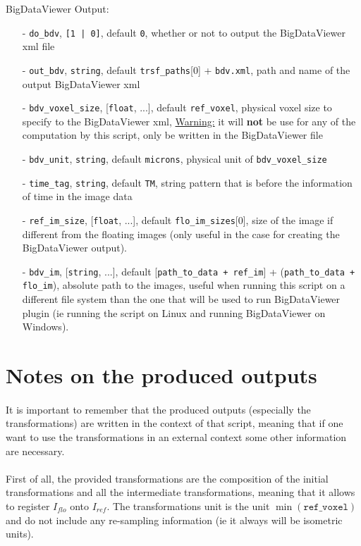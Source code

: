 \documentclass[10pt,a4paper]{book}
\begin{document}
BigDataViewer Output:
\begin{enumerate}
\item[-] \texttt{do\_bdv}, \texttt{[1 | 0]}, default \texttt{0}, whether or not to output the BigDataViewer xml file
\item[-] \texttt{out\_bdv}, \texttt{string}, default \texttt{trsf\_paths}[0] + \texttt{bdv.xml}, path and name of the output BigDataViewer xml
\item[-] \texttt{bdv\_voxel\_size}, [\texttt{float}, ...], default \texttt{ref\_voxel}, physical voxel size to specify to the BigDataViewer xml, \underline{Warning:} it will \textbf{not} be use for any of the computation by this script, only be written in the BigDataViewer file
\item[-] \texttt{bdv\_unit}, \texttt{string}, default \texttt{microns}, physical unit of \texttt{bdv\_voxel\_size}
\item[-] \texttt{time\_tag}, \texttt{string}, default \texttt{TM}, string pattern that is before the information of time in the image data
\item[-] \texttt{ref\_im\_size}, [\texttt{float}, ...], default \texttt{flo\_im\_sizes}[0], size of the image if different from the floating images (only useful in the case for creating the BigDataViewer output).
\item[-] \texttt{bdv\_im}, [\texttt{string}, ...], default [\texttt{path\_to\_data + ref\_im}] + (\texttt{path\_to\_data + flo\_im}), absolute path to the images, useful when running this script on a different file system than the one that will be used to run BigDataViewer plugin (ie running the script on Linux and running BigDataViewer on Windows).
\end{enumerate}
\section{Notes on the produced outputs}
\paragraph{}It is important to remember that the produced outputs (especially the transformations) are written in the context of that script, meaning that if one want to use the transformations in an external context some other information are necessary.
\paragraph{}First of all, the provided transformations are the composition of the initial transformations and all the intermediate transformations, meaning that it allows to register $I_{flo}$ onto $I_{ref}$. The transformations unit is the unit $\min(\texttt{ref\_voxel})$ and do not include any re-sampling information (ie it always will be isometric units).
\end{document}
